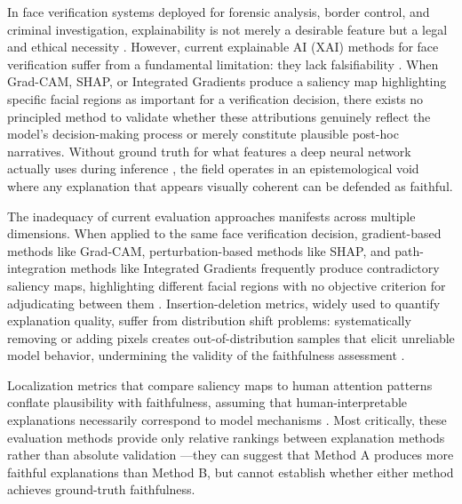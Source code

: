 In face verification systems deployed for forensic analysis, border control, and criminal investigation, explainability is not merely a desirable feature but a legal and ethical necessity \cite{wachter2017right,selbst2018intuitive}. However, current explainable AI (XAI) methods for face verification suffer from a fundamental limitation: they lack falsifiability \cite{popper1959logic}. When Grad-CAM, SHAP, or Integrated Gradients produce a saliency map highlighting specific facial regions as important for a verification decision, there exists no principled method to validate \cite{krishna2022disagreement,zhou2022evaluating} whether these attributions genuinely reflect the model's decision-making process or merely constitute plausible post-hoc narratives. Without ground truth for what features a deep neural network actually uses during inference \cite{doshivelez2017rigorous}, the field operates in an epistemological void where any explanation that appears visually coherent can be defended as faithful.

The inadequacy of current evaluation approaches manifests across multiple dimensions. When applied to the same face verification decision, gradient-based methods like Grad-CAM, perturbation-based methods like SHAP, and path-integration methods like Integrated Gradients frequently produce contradictory saliency maps, highlighting different facial regions with no objective criterion for adjudicating between them \cite{Adebayo2018_SanityChecks,Tomsett2020_SanityChecks,krishna2022disagreement}. Insertion-deletion metrics, widely used to quantify explanation quality, suffer from distribution shift problems: systematically removing or adding pixels creates out-of-distribution samples that elicit unreliable model behavior, undermining the validity of the faithfulness assessment \cite{hooker2019benchmark,rong2022consistent}.

Localization metrics that compare saliency maps to human attention patterns conflate plausibility with faithfulness, assuming that human-interpretable explanations necessarily correspond to model mechanisms \cite{Zhou2022_AttributionCorrectness,jacovi2020faithfully}. Most critically, these evaluation methods provide only relative rankings between explanation methods rather than absolute validation \cite{Nauta2023_QuantitativeEvaluation,hedstrom2023quantus}---they can suggest that Method A produces more faithful explanations than Method B, but cannot establish whether either method achieves ground-truth faithfulness.

